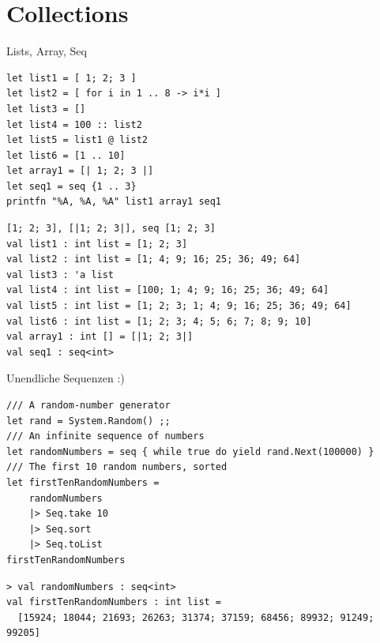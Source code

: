 \documentclass[t]{beamer}
\begin{document}
\section{Collections }
\label{sec:org470db13}

\begin{frame}[label={sec:orgd668586},fragile]{Lists, Array, Seq}
 \scriptsize

\begin{verbatim}
let list1 = [ 1; 2; 3 ]
let list2 = [ for i in 1 .. 8 -> i*i ]
let list3 = []
let list4 = 100 :: list2
let list5 = list1 @ list2
let list6 = [1 .. 10]
let array1 = [| 1; 2; 3 |]
let seq1 = seq {1 .. 3}
printfn "%A, %A, %A" list1 array1 seq1
\end{verbatim}

\begin{verbatim}
[1; 2; 3], [|1; 2; 3|], seq [1; 2; 3]
val list1 : int list = [1; 2; 3]
val list2 : int list = [1; 4; 9; 16; 25; 36; 49; 64]
val list3 : 'a list
val list4 : int list = [100; 1; 4; 9; 16; 25; 36; 49; 64]
val list5 : int list = [1; 2; 3; 1; 4; 9; 16; 25; 36; 49; 64]
val list6 : int list = [1; 2; 3; 4; 5; 6; 7; 8; 9; 10]
val array1 : int [] = [|1; 2; 3|]
val seq1 : seq<int>
\end{verbatim}
\end{frame}

\begin{frame}[label={sec:orgcb6fa20},fragile]{Unendliche Sequenzen :)}
 \begin{verbatim}
/// A random-number generator 
let rand = System.Random() ;;
/// An infinite sequence of numbers
let randomNumbers = seq { while true do yield rand.Next(100000) }
/// The first 10 random numbers, sorted
let firstTenRandomNumbers = 
    randomNumbers
    |> Seq.take 10 
    |> Seq.sort
    |> Seq.toList
firstTenRandomNumbers
\end{verbatim}

\begin{verbatim}
> val randomNumbers : seq<int>
val firstTenRandomNumbers : int list =
  [15924; 18044; 21693; 26263; 31374; 37159; 68456; 89932; 91249; 99205]
\end{verbatim}
\end{frame}
\end{document}
